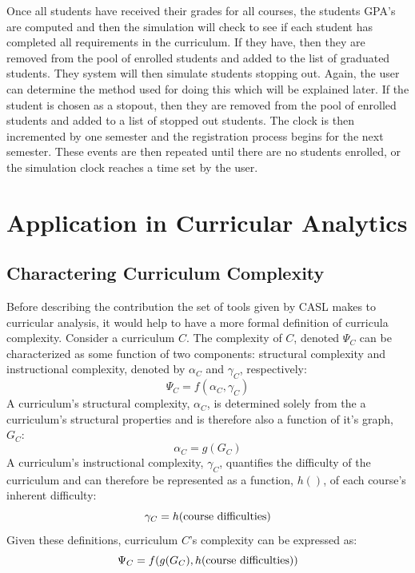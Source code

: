 \documentclass[botnum, fleqn]{unmeethesis}
\begin{document}
    Once all students have received their grades for all courses, the students GPA's are computed and then the simulation will check to see if each student has completed all requirements in the curriculum. If they have, then they are removed from the pool of enrolled students and added to the list of graduated students. They system will then simulate students stopping out. Again, the user can determine the method used for doing this which will be explained later. If the student is chosen as a stopout, then they are removed from the pool of enrolled students and added to a list of stopped out students. The clock is then incremented by one semester and the registration process begins for the next semester. These events are then repeated until there are no students enrolled, or the simulation clock reaches a time set by the user.


\chapter{Application in Curricular Analytics}

  \section{Charactering Curriculum Complexity}
    Before describing the contribution the set of tools given by CASL makes to curricular analysis, it would help to have a more formal definition of curricula complexity. Consider a curriculum $C$. The complexity of $C$, denoted $\Psi_C$ can be characterized as some function of two components: structural complexity and instructional complexity, denoted by $\alpha_C$ and $\gamma_C$, respectively:
    \[
      \Psi_C = f(\alpha_C, \gamma_C)
    \]
    A curriculum's structural complexity, $\alpha_C$, is determined solely from the a curriculum's structural properties and is therefore also a function of it's graph, $G_C$:
    \[
      \alpha_C = g(G_C)
    \]
    A curriculum's instructional complexity, $\gamma_C$, quantifies the difficulty of the curriculum and can therefore be represented as a function, $h()$, of each course's inherent difficulty:
    \[
      \gamma_C = h(\mbox{\rm course difficulties})
    \]
    Given these definitions, curriculum $C$'s complexity can be expressed as:
    \[
      \Psi_C = f(g(G_C), h(\mbox{\rm course difficulties}))
    \]
\end{document}

